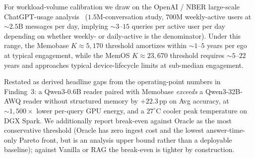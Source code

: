 For workload-volume calibration we draw on the OpenAI / NBER large-scale ChatGPT-usage analysis~\citep{chatterji2025chatgpt} ($1.5$M-conversation study, $700$M weekly-active users at ${\sim}2.5$B messages per day, implying ${\sim}3$--$15$ queries per active user per day depending on whether weekly- or daily-active is the denominator). Under this range, the Memobase $K{\approx}5{,}170$ threshold amortizes within ${\sim}1$--$5$ years per ego at typical engagement, while the MemOS $K{\approx}23{,}670$ threshold requires ${\sim}5$--$22$ years and approaches typical device-lifecycle limits at sub-median engagement.

Restated as derived headline gaps from the operating-point numbers in Finding~3: a Qwen3-0.6B reader paired with Memobase \emph{exceeds} a Qwen3-32B-AWQ reader without structured memory by $+22.3$\,pp on Avg accuracy, at ${\sim}1{,}500\times$ lower per-query GPU energy, and a $27^\circ$C cooler peak temperature on DGX Spark. We additionally report break-even against Oracle as the most conservative threshold (Oracle has zero ingest cost and the lowest answer-time-only Pareto front, but is an analysis upper bound rather than a deployable baseline); against Vanilla or RAG the break-even is tighter by construction.




